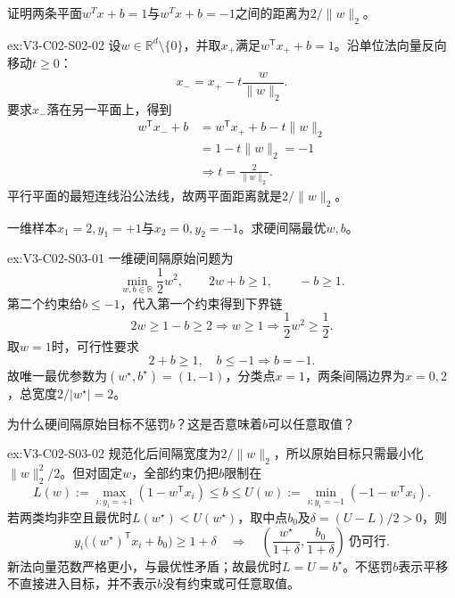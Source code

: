 \begin{SLChapterExercisePairSection}
\begin{exercise}\label{ex:V3-C02-S02-02}
证明两条平面$w^Tx+b=1$与$w^Tx+b=-1$之间的距离为$2/\lVert w\rVert_2$。
\end{exercise}
\ifSLFullEdition
{}\label{sol:V3-C02-S02-02}
\begin{chapterexercisesolution}{ex:V3-C02-S02-02}
设$w\in\mathbb R^d\setminus\{0\}$，并取$x_+$满足$w^{\mathsf T}x_++b=1$。沿单位法向量反向移动$t\geq0$：
\[
x_-=x_+-t\frac{w}{\lVert w\rVert_2}.
\]
要求$x_-$落在另一平面上，得到
\[
\begin{aligned}
w^{\mathsf T}x_-+b
&=w^{\mathsf T}x_++b-t\lVert w\rVert_2\\
&=1-t\lVert w\rVert_2=-1\\
&\Longrightarrow t=\frac2{\lVert w\rVert_2}.
\end{aligned}
\]
平行平面的最短连线沿公法线，故两平面距离就是$2/\lVert w\rVert_2$。
\end{chapterexercisesolution}
\fi

\begin{exercise}\label{ex:V3-C02-S03-01}
一维样本$x_1=2,y_1=+1$与$x_2=0,y_2=-1$。求硬间隔最优$w,b$。
\end{exercise}
\ifSLFullEdition
{}\label{sol:V3-C02-S03-01}
\begin{chapterexercisesolution}{ex:V3-C02-S03-01}
一维硬间隔原始问题为
\[
\min_{w,b\in\mathbb R}\frac12w^2,
\qquad
2w+b\geq1,
\qquad
-b\geq1.
\]
第二个约束给$b\leq-1$，代入第一个约束得到下界链
\[
2w\geq1-b\geq2
\Longrightarrow w\geq1
\Longrightarrow \frac12w^2\geq\frac12.
\]
取$w=1$时，可行性要求
\[
2+b\geq1,\quad b\leq-1
\Longrightarrow b=-1.
\]
故唯一最优参数为$(w^\star,b^\star)=(1,-1)$，分类点$x=1$，两条间隔边界为$x=0,2$，总宽度$2/|w^\star|=2$。
\end{chapterexercisesolution}
\fi

\begin{exercise}\label{ex:V3-C02-S03-02}
为什么硬间隔原始目标不惩罚$b$？这是否意味着$b$可以任意取值？
\end{exercise}
\ifSLFullEdition
{}\label{sol:V3-C02-S03-02}
\begin{chapterexercisesolution}{ex:V3-C02-S03-02}
规范化后间隔宽度为$2/\lVert w\rVert_2$，所以原始目标只需最小化$\lVert w\rVert_2^2/2$。但对固定$w$，全部约束仍把$b$限制在
\[
L(w):=\max_{i:y_i=+1}(1-w^{\mathsf T}x_i)
\leq b\leq
U(w):=\min_{i:y_i=-1}(-1-w^{\mathsf T}x_i).
\]
若两类均非空且最优时$L(w^\star)<U(w^\star)$，取中点$b_0$及$\delta=(U-L)/2>0$，则
\[
y_i\bigl((w^\star)^{\mathsf T}x_i+b_0\bigr)\geq1+\delta
\quad\Longrightarrow\quad
\left(\frac{w^\star}{1+\delta},\frac{b_0}{1+\delta}\right)
\ \text{仍可行}.
\]
新法向量范数严格更小，与最优性矛盾；故最优时$L=U=b^\star$。不惩罚$b$表示平移不直接进入目标，并不表示$b$没有约束或可任意取值。
\end{chapterexercisesolution}
\fi


\end{SLChapterExercisePairSection}
